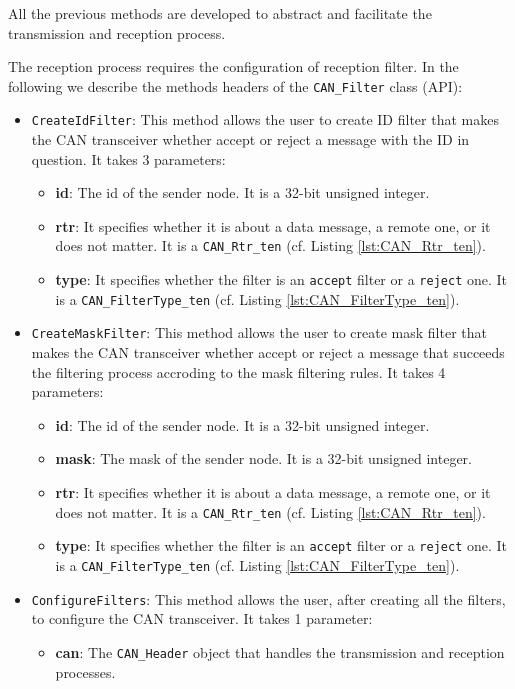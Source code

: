 All the previous methods are developed to abstract and facilitate the transmission and reception process.

The reception process requires the configuration of reception filter. In the following we describe the methods headers of the \texttt{CAN\_Filter} class (API):

\begin{itemize} 
    \item \verb|CreateIdFilter|:
    This method allows the user to create ID filter that makes the CAN transceiver whether accept or reject a message with the ID in question. It takes 3 parameters:
    \begin{itemize}
        \item \textbf{id}: The id of the sender node. It is a 32-bit unsigned integer.
        \item \textbf{rtr}: It specifies whether it is about a data message, a remote one, or it does not matter. It is a \texttt{CAN\_Rtr\_ten} (cf. Listing \ref{lst:CAN_Rtr_ten}).
        \item \textbf{type}: It specifies whether the filter is an \texttt{accept} filter or a \texttt{reject} one. It is a \texttt{CAN\_FilterType\_ten} (cf. Listing \ref{lst:CAN_FilterType_ten}).
    \end{itemize}

    \item \verb|CreateMaskFilter|:
    This method allows the user to create mask filter that makes the CAN transceiver whether accept or reject a message that succeeds the filtering process accroding to the mask filtering rules. It takes 4 parameters:
    \begin{itemize}
        \item \textbf{id}: The id of the sender node. It is a 32-bit unsigned integer.
        \item \textbf{mask}: The mask of the sender node. It is a 32-bit unsigned integer.
        \item \textbf{rtr}: It specifies whether it is about a data message, a remote one, or it does not matter. It is a \texttt{CAN\_Rtr\_ten} (cf. Listing \ref{lst:CAN_Rtr_ten}).
        \item \textbf{type}: It specifies whether the filter is an \texttt{accept} filter or a \texttt{reject} one. It is a \texttt{CAN\_FilterType\_ten} (cf. Listing \ref{lst:CAN_FilterType_ten}).
    \end{itemize}

    \item \verb|ConfigureFilters|:
    This method allows the user, after creating all the filters, to configure the CAN transceiver. It takes 1 parameter:
    \begin{itemize}
        \item \textbf{can}: The \texttt{CAN\_Header} object that handles the transmission and reception processes.
    \end{itemize}
\end{itemize}

